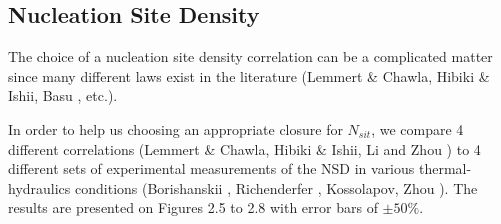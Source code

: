 \subsection{Nucleation Site Density}


\begin{table}[h!]


\noindent{}


\caption{Nucleation Site Density data in vertical flow boiling}
\label{tab:nsit_exp_data}


\end{table}

The choice of a nucleation site density correlation can be a complicated matter since many different laws exist in the literature (Lemmert \& Chawla, Hibiki \& Ishii, Basu \etal, etc.).

\npar

In order to help us choosing an appropriate closure for $N_{sit}$, we compare 4 different correlations (Lemmert \& Chawla, Hibiki \& Ishii, Li \etal and Zhou \etal) to 4 different sets of experimental measurements of the NSD in various thermal-hydraulics conditions (Borishanskii \etal, Richenderfer \etal, Kossolapov, Zhou \etal). The results are presented on Figures 2.5 to 2.8 with error bars of $\pm 50 \%$.



